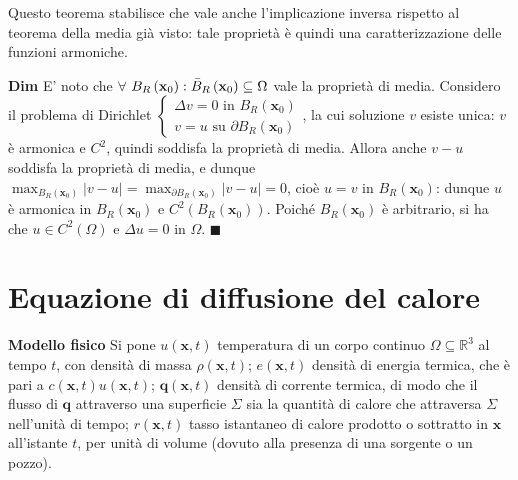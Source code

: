 \documentclass{article}
\begin{document}
Questo teorema stabilisce che vale anche l'implicazione inversa rispetto al
teorema della media gi\`{a} visto: tale propriet\`{a} \`{e} quindi una
caratterizzazione delle funzioni armoniche.

\textbf{Dim} E' noto che $\forall $ $B_{R}\left( \mathbf{x}_{0}\right) :\bar{%
B}_{R}\left( \mathbf{x}_{0}\right) \subseteq \Omega $ vale la propriet\`{a}
di media. Considero il problema di Dirichlet $\left\{ 
\begin{array}{c}
\Delta v=0\text{ in }B_{R}\left( \mathbf{x}_{0}\right) \\ 
v=u\text{ su }\partial B_{R}\left( \mathbf{x}_{0}\right)%
\end{array}%
\right. $, la cui soluzione $v$ esiste unica: $v$ \`{e} armonica e $C^{2}$,
quindi soddisfa la propriet\`{a} di media. Allora anche $v-u$ soddisfa la
propriet\`{a} di media, e dunque $\max_{B_{R}\left( \mathbf{x}_{0}\right)
}\left\vert v-u\right\vert =\max_{\partial B_{R}\left( \mathbf{x}_{0}\right)
}\left\vert v-u\right\vert =0$, cio\`{e} $u=v$ in $B_{R}\left( \mathbf{x}%
_{0}\right) $: dunque $u$ \`{e} armonica in $B_{R}\left( \mathbf{x}%
_{0}\right) $ e $C^{2}\left( B_{R}\left( \mathbf{x}_{0}\right) \right) $.
Poich\'{e} $B_{R}\left( \mathbf{x}_{0}\right) $ \`{e} arbitrario, si ha che $%
u\in C^{2}\left( \Omega \right) $ e $\Delta u=0$ in $\Omega $. $\blacksquare 
$

\section{Equazione di diffusione del calore}

\textbf{Modello fisico} Si pone $u\left( \mathbf{x},t\right) $ temperatura
di un corpo continuo $\Omega \subseteq 
\mathbb{R}
^{3}$ al tempo $t$, con densit\`{a} di massa $\rho \left( \mathbf{x}%
,t\right) $; $e\left( \mathbf{x},t\right) $ densit\`{a} di energia termica,
che \`{e} pari a $c\left( \mathbf{x},t\right) u\left( \mathbf{x},t\right) $; 
$\mathbf{q}\left( \mathbf{x},t\right) $ densit\`{a} di corrente termica, di
modo che il flusso di $\mathbf{q}$ attraverso una superficie $\Sigma $ sia
la quantit\`{a} di calore che attraversa $\Sigma $ nell'unit\`{a} di tempo; $%
r\left( \mathbf{x},t\right) $ tasso istantaneo di calore prodotto o
sottratto in $\mathbf{x}$ all'istante $t$, per unit\`{a} di volume (dovuto
alla presenza di una sorgente o un pozzo).
\end{document}
